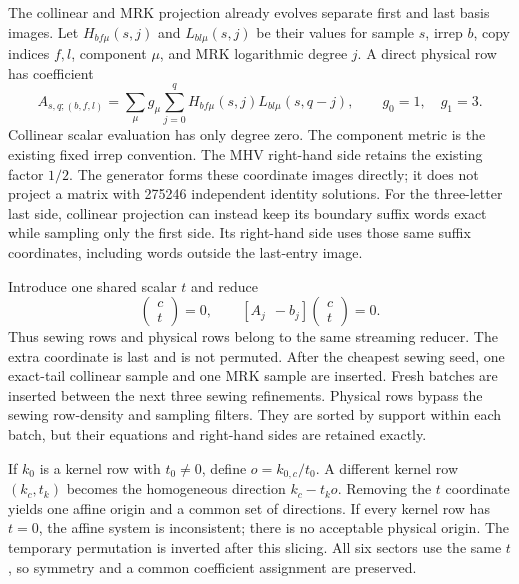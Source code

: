 \documentclass[11pt]{article}
\begin{document}
The collinear and MRK projection already evolves separate first and last
basis images. Let $H_{bf\mu}(s,j)$ and $L_{bl\mu}(s,j)$ be their values for
sample $s$, irrep $b$, copy indices $f,l$, component $\mu$, and MRK
logarithmic degree $j$. A direct physical row has coefficient
\begin{equation}
 A_{s,q;(b,f,l)}=\sum_\mu g_\mu\sum_{j=0}^{q}
 H_{bf\mu}(s,j)L_{bl\mu}(s,q-j),
 \qquad g_0=1,\quad g_1=3.
\end{equation}
Collinear scalar evaluation has only degree zero. The component metric is
the existing fixed irrep convention. The MHV right-hand side retains the
existing factor $1/2$. The generator forms these coordinate images directly;
it does not project a matrix with 275246 independent identity solutions.
For the three-letter last side, collinear projection can instead keep its
boundary suffix words exact while sampling only the first side. Its
right-hand side uses those same suffix coordinates, including words outside
the last-entry image.

Introduce one shared scalar $t$ and reduce
\begin{equation}
 [M\ \ 0]\begin{pmatrix}c\\t\end{pmatrix}=0,
 \qquad [A_j\ \ -b_j]\begin{pmatrix}c\\t\end{pmatrix}=0.
\end{equation}
Thus sewing rows and physical rows belong to the same streaming reducer.
The extra coordinate is last and is not permuted. After the cheapest sewing
seed, one exact-tail collinear sample and one MRK sample are inserted. Fresh
batches are inserted between the next three sewing refinements. Physical
rows bypass the sewing row-density and sampling filters. They are sorted
by support within each batch, but their equations and right-hand sides are
retained exactly.

If $k_0$ is a kernel row with $t_0\ne0$, define $o=k_{0,c}/t_0$. A different
kernel row $(k_c,t_k)$ becomes the homogeneous direction $k_c-t_k o$.
Removing the $t$ coordinate yields one affine origin and a common set of
directions. If every kernel row has $t=0$, the affine system is inconsistent;
there is no acceptable physical origin. The temporary permutation is
inverted after this slicing. All six sectors use the same $t$, so symmetry
and a common coefficient assignment are preserved.
\end{document}
